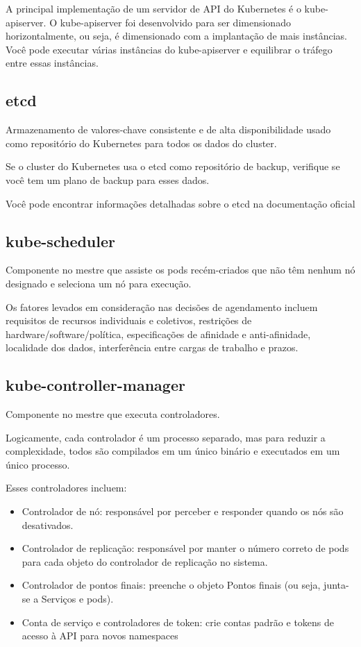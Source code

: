 A principal implementação de um servidor de API do Kubernetes é o kube-apiserver. O kube-apiserver foi desenvolvido para ser dimensionado horizontalmente, ou seja, é dimensionado com a implantação de mais instâncias. Você pode executar várias instâncias do kube-apiserver e equilibrar o tráfego entre essas instâncias.

\subsection{etcd}

Armazenamento de valores-chave consistente e de alta disponibilidade usado como repositório do Kubernetes para todos os dados do cluster.

Se o cluster do Kubernetes usa o etcd como repositório de backup, verifique se você tem um plano de backup para esses dados.

Você pode encontrar informações detalhadas sobre o etcd na documentação oficial

\subsection{kube-scheduler}

Componente no mestre que assiste os pods recém-criados que não têm nenhum nó designado e seleciona um nó para execução.

Os fatores levados em consideração nas decisões de agendamento incluem requisitos de recursos individuais e coletivos, restrições de hardware/software/política, especificações de afinidade e anti-afinidade, localidade dos dados, interferência entre cargas de trabalho e prazos.

\subsection{kube-controller-manager}

Componente no mestre que executa controladores.

Logicamente, cada controlador é um processo separado, mas para reduzir a complexidade, todos são compilados em um único binário e executados em um único processo.

Esses controladores incluem:
\begin{itemize}
	\item Controlador de nó: responsável por perceber e responder quando os nós são desativados.
	\item Controlador de replicação: responsável por manter o número correto de pods para cada objeto do controlador de replicação no sistema.
	\item Controlador de pontos finais: preenche o objeto Pontos finais (ou seja, junta-se a Serviços e pods).
	\item Conta de serviço e controladores de token: crie contas padrão e tokens de acesso à API para novos namespaces
\end{itemize}

